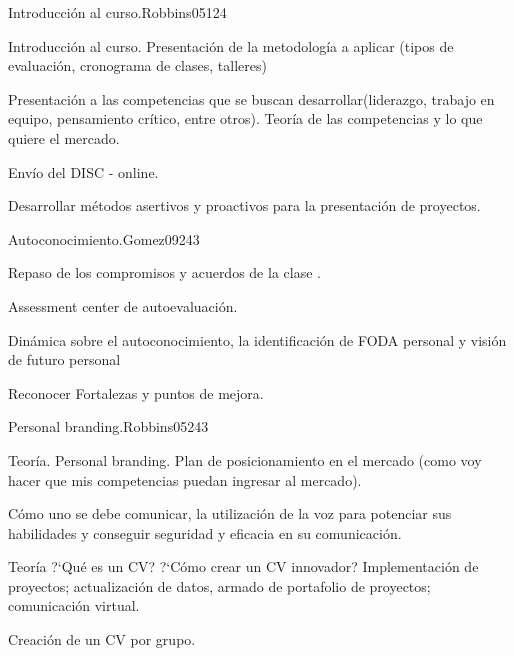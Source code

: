 \begin{syllabus}
\begin{unit}{Introducción al curso.}{}{Robbins05}{12}{4}
   \begin{topics}
      \item Introducción al curso. Presentación de la metodología a aplicar (tipos de evaluación, cronograma de clases, talleres)
      \item Presentación a las competencias que se buscan desarrollar(liderazgo, trabajo en equipo, pensamiento crítico, entre otros). Teoría de las competencias y lo que quiere el mercado.
      \item Envío del DISC - online.
   \end{topics}
   \begin{learningoutcomes}
      \item Desarrollar métodos asertivos y proactivos para la presentación de proyectos.
   \end{learningoutcomes}
\end{unit}

\begin{unit}{Autoconocimiento.}{}{Gomez09}{24}{3}
   \begin{topics}
      \item Repaso de los compromisos y acuerdos de la clase .
      \item Assessment center de autoevaluación.
      \item Dinámica sobre el autoconocimiento, la identificación de FODA personal y visión de futuro personal
   \end{topics}

   \begin{learningoutcomes}
      \item Reconocer Fortalezas y puntos de mejora.
      \end{learningoutcomes}
\end{unit}

\begin{unit}{Personal branding.}{}{Robbins05}{24}{3}
   \begin{topics}
      \item Teoría. Personal branding. Plan de posicionamiento en el mercado (como voy hacer que mis competencias puedan ingresar al mercado).
      \item Cómo uno se debe comunicar, la utilización de la voz para potenciar sus habilidades y conseguir seguridad y eficacia en su comunicación.
      \item Teoría ?`Qué es un CV? ?`Cómo crear un CV innovador? Implementación de proyectos; actualización de datos, armado de portafolio de proyectos; comunicación virtual.
      \item Creación de un CV por grupo.
   \end{topics}


\end{unit}
\end{syllabus}

